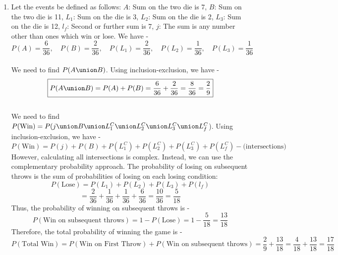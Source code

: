 \begin{enumerate}
              This means that the red cups must be placed on blue saucers and the blue cups on red saucers. Hence,  
              \[
              \begin{aligned}
                \text{Number of ways to place red cups on blue saucers} &= 2! = 2, \\
                \text{Number of ways to place blue cups on red saucers} &= 2! = 2.
            \end{aligned}
              \]
              Therefore, the total number of favorable arrangements is -  
              $$\text{Favorable arrangements} = 2! \times 2! = 4.$$
              Thus, the required probability is -
              \[
              P(\text{no cup on same color}) = \frac{\text{favorable arrangements}}{\text{total arrangements}} = \frac{4}{24} = \frac{1}{6}
              \]
              \[
              \boxed{P = \frac{1}{6}}
              \]
        \item Let the events be defined as follows:
        $A$: Sum on the two die is 7, $B$: Sum on the two die is 11, $L_1$: Sum on the die is 3, $L_2$: Sum on the die is 2, $L_3$: Sum on the die is 12, $l_f$: Second or further sum is 7, $j$: The sum is any number other than ones which win or lose.  We have - 
        $$P(A) = \frac{6}{36}, \quad P(B) = \frac{2}{36}, \quad P(L_1) = \frac{2}{36}, \quad P(L_2) = \frac{1}{36}, \quad P(L_3) = \frac{1}{36}$$
         \\ 
        We need to find $P(A \union B)$. Using inclusion-exclusion, we have -
        \[\boxed{P(A \union B) = P(A) + P(B) = \frac{6}{36} + \frac{2}{36} = \frac{8}{36} = \frac{2}{9}
        }\]
         \\
        We need to find $P(\text{Win}) = P(j \union B \union L_1^C \union L_2^C \union L_3^C \union L_f^C$).
        Using inclusion-exclusion, we have -
        \[P(\text{Win}) = P(j) + P(B) + P(L_1^C) + P(L_2^C) + P(L_3^C) + P(L_f^C) - \text{(intersections)}\]
        However, calculating all intersections is complex. Instead, we can use the complementary probability approach.
        The probability of losing on subsequent throws is the sum of probabilities of losing on each losing condition:
        \[P(\text{Lose}) = P(L_1) + P(L_2) + P(L_3) + P(l_f)\]
        \[= \frac{2}{36} + \frac{1}{36} + \frac{1}{36} + \frac{6}{36} = \frac{10}{36} = \frac{5}{18}\]
        Thus, the probability of winning on subsequent throws is -
        \[\boxed{P(\text{Win on subsequent throws}) = 1 - P(\text{Lose}) = 1 - \frac{5}{18} = \frac{13}{18}
        }\]
        Therefore, the total probability of winning the game is -
        \[\boxed{P(\text{Total Win}) = P(\text{Win on First Throw}) + P(\text{Win on subsequent throws}) = \frac{2}{9} + \frac{13}{18} = \frac{4}{18} + \frac{13}{18} = \frac{17}{18}
        }\]
\end{enumerate}
